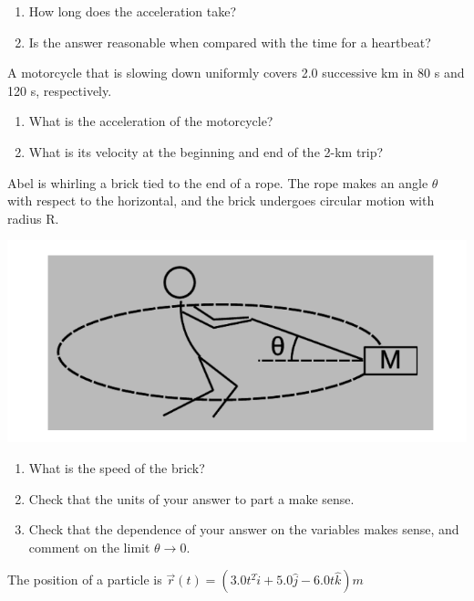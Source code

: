 \documentclass[12pt,addpoints]{exam}
\begin{document}
\begin{center}
\begin{questions}
\begin{enumerate}[label=(\alph*)]
				\item How long does the acceleration take?\vspace{1in}
				\item Is the answer reasonable when compared with the time for a heartbeat?\vspace{0.5in}
			\end{enumerate}
			\question A motorcycle that is slowing down uniformly covers 2.0 successive km in 80 s and 120 s, respectively. 
			\begin{enumerate}[label=(\alph*)]
				\item What is the acceleration of the motorcycle?\vspace{1in} 
				\item What is its velocity at the beginning and end of the 2-km trip?\vspace{1in}
			\end{enumerate}
			\question Abel is whirling a brick tied to the end of a rope. The rope makes an angle $\theta$ with respect to the horizontal, and the brick undergoes circular motion with radius R.
			\begin{center}
				\includegraphics[scale=0.3]{pic4.png}
			\end{center}
			\begin{enumerate}[label=(\alph*)]
				\item What is the speed of the brick?\vspace{1in}
				\item Check that the units of your answer to part
				a make sense.\vspace{1in}
				\item Check that the dependence of your answer
				on the variables makes sense, and comment on
				the limit $\theta \to 0$.\vspace{2in}
			\end{enumerate}
			\question The position of a particle is  $\vec r(t)=(3.0t^2\hat i+5.0\hat j-6.0t\hat k)m$

\end{questions}
\end{center}
\end{document}
